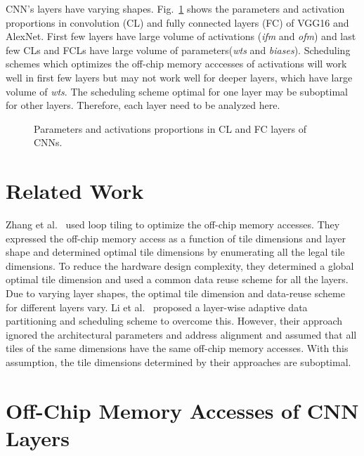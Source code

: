 CNN's layers have varying shapes. Fig.~\ref{fig:ParamsNactProp} shows the parameters and activation proportions in convolution (CL) and fully connected layers (FC) of VGG16 and AlexNet. First few layers have large volume of activations (\textit{ifm} and \textit{ofm}) and last few CLs and FCLs have large volume of parameters(\textit{wts} and \textit{biases}). Scheduling schemes which optimizes the off-chip memory acccesses of activations will work well in first few layers but may not work well for deeper layers, which have large volume of \textit{wts}. The scheduling scheme optimal for one layer may be suboptimal for other layers. Therefore, each layer need to be analyzed here.
\begin{figure}[!htb]
	\centering
	\captionsetup{font=sf}	
	\hfil	
	\hfil	
	\caption{Parameters and activations proportions in CL and FC layers of CNNs.}
	\label{fig:ParamsNactProp}
\end{figure}
\section{Related Work}
Zhang et al.~\cite{zhang2015optimizing} used loop tiling to optimize the off-chip memory accesses. They expressed the off-chip memory access as a function of tile dimensions and layer shape and determined optimal tile dimensions by enumerating all the legal tile dimensions. To reduce the hardware design complexity, they determined a global optimal tile dimension and used a common data reuse scheme for all the layers. Due to varying layer shapes, the optimal tile dimension and data-reuse scheme for different layers vary. Li et al.~\cite{Li2018SmartShuttleOO} proposed a layer-wise adaptive data partitioning and scheduling scheme to overcome this. However, their approach ignored the architectural parameters and address alignment and assumed that all tiles of the same dimensions have the same off-chip memory accesses. With this assumption, the tile dimensions determined by their approaches are suboptimal.
\section{Off-Chip Memory Accesses of CNN Layers}\label{MemAccess_CNN}
